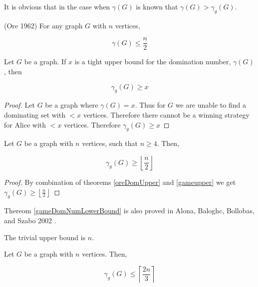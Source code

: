     It is obvious that in the case when $\gamma(G)$ is known that $\gamma(G) > \gamma_g(G)$.
    
\begin{theorem}(Ore 1962) \label{oreDomUpper} \cite{oysteinore1962}
    For any graph $G$ with $n$ vertices, 
    
    \[\gamma(G) \leq \frac{n}{2}\]
\end{theorem}


\begin{theorem}\label{gameupper}
    Let $G$ be a graph. If $x$ is a tight upper bound for the domination number, $\gamma(G)$, then  
    
    \[ \gamma_g(G) \geq x\]
\end{theorem}

\begin{proof}
    Let $G$ be a graph where $\gamma(G) = x$.
    Thus for $G$ we are unable to find a dominating set with $ < x$ vertices.
    Therefore there cannot be a winning strategy for Alice with $< x$ vertices.
    Therefore $\gamma_g(G) \geq x$
\end{proof}


\begin{theorem} \label{gameDomNumLowerBound}
    Let $G$ be a graph with $n$ vertices, such that $n \geq 4$. Then,
    
    \[ \gamma_g(G) \geq \left \lfloor{\frac{n}{2}}\right \rfloor \]
    
\end{theorem}

\begin{proof}
    By combination of theorems \ref{oreDomUpper} and \ref{gameupper} we get  $ \gamma_g(G) \geq \left \lfloor{\frac{n}{2}}\right \rfloor $
\end{proof}

Thereom \ref{gameDomNumLowerBound} is also proved in Alona, Baloghc, Bollobas, and Szabo 2002 \cite{AlBABoSz2002}.

The trivial upper bound is $n$.

\begin{theorem}
    Let $G$ be a graph with $n$ vertices. Then,
    
    \[ \gamma_g(G) \leq \left\lceil \frac{2n}{3} \right\rceil\]
\end{theorem}
 
